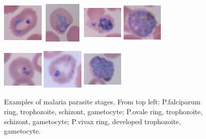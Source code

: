 \documentclass[final,a4paper,12pt,english]{UnicaPhdThesis3}
\begin{document}
{\begin{figure}[!b]
		\includegraphics[width=2cm, height=2cm]{images/malaria/ovale_1_ring}
		\includegraphics[width=2cm, height=2cm]{images/malaria/ovale_2_trophozoite}
		\includegraphics[width=2cm, height=2cm]{images/malaria/ovale_3_schizont}
		\includegraphics[width=2cm, height=2cm]{images/malaria/ovale_4_gametocyte}
		
		\includegraphics[width=2cm, height=2cm]{images/malaria/vivax_1_ring}
		\includegraphics[width=2cm, height=2cm]{images/malaria/vivax_2c_trophozoiteDeveloped}
		\includegraphics[width=2cm, height=2cm]{images/malaria/vivax_4_gametocyte}
		\caption{\label{fig6_malaria_stages}Examples of malaria parasite stages. From top left: P.falciparum ring, trophozoite, schizont, gametocyte;
			P.ovale ring, trophozoite, schizont, gametocyte; P.vivax ring, developed trophozoite, gametocyte. \cite{Loddo2018}}
	\end{figure}

}
\end{document}
